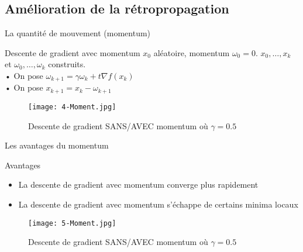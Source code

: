 \subsection{Amélioration de la rétropropagation}



\begin{frame}{La quantité de mouvement (momentum)}
    \begin{block}{Descente de gradient avec momentum}
        $x_0$ aléatoire, momentum $\omega_0 = 0$.
        $x_0, \ldots, x_k$ et $\omega_0, \ldots, \omega_k$ construits. \\
        • On pose $\omega_{k+1} = \gamma \omega_k + t \nabla f(x_k)$ \\
        • On pose $x_{k+1} = x_k - \omega_{k+1}$
    \end{block}
    \begin{figure}
        \centering
        \texttt{[image: 4-Moment.jpg]}
        \caption{Descente de gradient SANS/AVEC momentum où $\gamma = 0.5$}
    \end{figure}
\end{frame}



\begin{frame}{Les avantages du momentum}
    \begin{exampleblock}{Avantages}
        \begin{itemize}
            \item La descente de gradient avec momentum converge plus rapidement
            \item La descente de gradient avec momentum s'échappe de certains minima locaux  
        \end{itemize}  
    \end{exampleblock}
    \begin{figure}
        \centering
        \texttt{[image: 5-Moment.jpg]}
        \caption{Descente de gradient SANS/AVEC momentum où $\gamma = 0.5$}
    \end{figure}
\end{frame}




